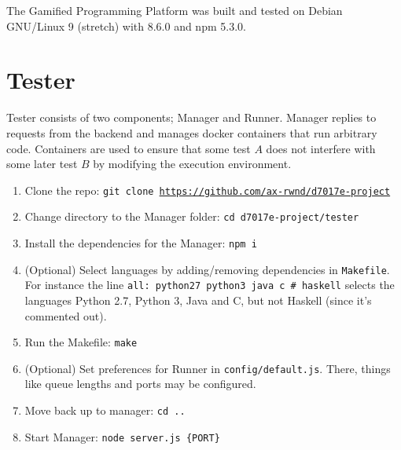 The Gamified Programming Platform was built and tested on Debian GNU/Linux 9 (stretch) with \nodejs{} 8.6.0 and npm 5.3.0.

\section{Tester}
Tester consists of two components; Manager and Runner. Manager replies to requests from the backend and manages docker containers that run arbitrary code. Containers are used to ensure that some test $A$ does not interfere with some later test $B$ by modifying the execution environment.\\
\begin{enumerate}
    \item Clone the repo: \texttt{git clone \url{https://github.com/ax-rwnd/d7017e-project}}
    \item Change directory to the Manager folder: \texttt{cd d7017e-project/tester}
    \item Install the dependencies for the Manager: \texttt{npm i}
    \item (Optional) Select languages by adding/removing dependencies in \texttt{Makefile}. For instance the line \texttt{all: python27 python3 java c \# haskell} selects the languages Python 2.7, Python 3, Java and C, but not Haskell (since it's commented out).
    \item Run the Makefile: \texttt{make}
    \item (Optional) Set preferences for Runner in \texttt{config/default.js}. There, things like queue lengths and ports may be configured.
    \item Move back up to manager: \texttt{cd ..}
    \item Start Manager: \texttt{node server.js \{PORT\}}
\end{enumerate}

